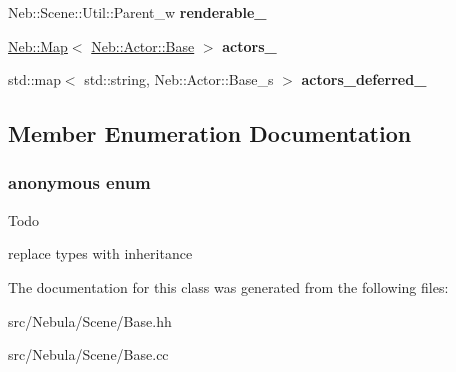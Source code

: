 \begin{DoxyCompactItemize}
\item 
\hypertarget{classNeb_1_1Scene_1_1Base_ab80c1fb37a3aa9bf1c3215b0f3614214}{\-Neb\-::\-Scene\-::\-Util\-::\-Parent\-\_\-w {\bfseries renderable\-\_\-}}\label{classNeb_1_1Scene_1_1Base_ab80c1fb37a3aa9bf1c3215b0f3614214}

\item 
\hypertarget{classNeb_1_1Scene_1_1Base_af8f8ecef2f02a6b5b30f444a17a260ef}{\hyperlink{classNeb_1_1Map}{\-Neb\-::\-Map}$<$ \hyperlink{classNeb_1_1Actor_1_1Base}{\-Neb\-::\-Actor\-::\-Base} $>$ {\bfseries actors\-\_\-}}\label{classNeb_1_1Scene_1_1Base_af8f8ecef2f02a6b5b30f444a17a260ef}

\item 
\hypertarget{classNeb_1_1Scene_1_1Base_abea83d53821e8fee2a51afc5223e9b7c}{std\-::map$<$ std\-::string, \*
\-Neb\-::\-Actor\-::\-Base\-\_\-s $>$ {\bfseries actors\-\_\-deferred\-\_\-}}\label{classNeb_1_1Scene_1_1Base_abea83d53821e8fee2a51afc5223e9b7c}

\end{DoxyCompactItemize}


\subsection{\-Member \-Enumeration \-Documentation}
\hypertarget{classNeb_1_1Scene_1_1Base_ad9c45dfefe66cecc599a4707b25a95f8}{\subsubsection[{anonymous enum}]{\setlength{\rightskip}{0pt plus 5cm}anonymous enum}}\label{classNeb_1_1Scene_1_1Base_ad9c45dfefe66cecc599a4707b25a95f8}
\begin{DoxyRefDesc}{\-Todo}
\item[{\bf \-Todo}]replace types with inheritance \end{DoxyRefDesc}


\-The documentation for this class was generated from the following files\-:\begin{DoxyCompactItemize}
\item 
src/\-Nebula/\-Scene/\-Base.\-hh\item 
src/\-Nebula/\-Scene/\-Base.\-cc\end{DoxyCompactItemize}
